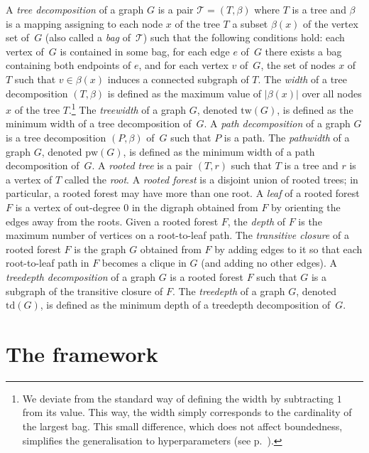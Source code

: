 \documentclass[11pt]{article}
\newcommand{\td}{\mathrm{td}}
\newcommand{\tw}{\mathrm{tw}}
\newcommand{\pw}{\mathrm{pw}}
\theoremstyle{plain}
\theoremstyle{definition}
\theoremstyle{remark}
\numberwithin{equation}{section}
\begin{document}
A \emph{tree decomposition} of a graph $G$ is a pair $\mathcal{T} =(T,\beta)$ where $T$ is a tree and $\beta$ is a mapping assigning to each node $x$ of the tree $T$ a subset $\beta(x)$ of the vertex set of~$G$ (also called a \emph{bag} of~$\mathcal{T}$) such that the following conditions hold: each vertex of~$G$ is contained in some bag, for each edge $e$ of~$G$ there exists a bag containing both endpoints of $e$, and for each vertex $v$ of~$G$, the set of nodes $x$ of $T$ such that $v\in \beta(x)$ induces a connected subgraph of $T$.
The \emph{width} of a tree decomposition $(T,\beta)$ is defined as the maximum value of $|\beta(x)|$ over all nodes $x$ of the tree $T$.\footnote{We deviate from the standard way of defining the width by subtracting $1$ from its value. This way, the width simply corresponds to the cardinality of the largest bag. 
This small difference, which does not affect boundedness, simplifies the generalisation to hyperparameters (see p.~\pageref{treewidth-hyperparameterisation}).}
The \emph{treewidth} of a graph $G$, denoted $\tw(G)$, is defined as the minimum width of a tree decomposition of~$G$.
A \emph{path decomposition} of a graph $G$ is a tree decomposition $(P,\beta)$ of~$G$ such that $P$ is a path.
The \emph{pathwidth} of a graph $G$, denoted $\pw(G)$, is defined as the minimum width of a path decomposition of~$G$.
A \emph{rooted tree} is a pair $(T,r)$ such that $T$ is a tree and $r$ is a vertex of $T$ called the \emph{root}.
A \emph{rooted forest} is a disjoint union of rooted trees; in particular, a rooted forest may have more than one root.
A \emph{leaf} of a rooted forest $F$ is a vertex of out-degree $0$ in the digraph obtained from $F$ by orienting the edges away from the roots.
Given a rooted forest $F$, the \emph{depth} of $F$ is the maximum number of vertices on a root-to-leaf path.
The \emph{transitive closure} of a rooted forest $F$ is the graph $G$ obtained from $F$ by adding edges to it so that each root-to-leaf path in $F$ becomes a clique in $G$ (and adding no other edges).
A \emph{treedepth decomposition} of a graph $G$ is a rooted forest $F$ such that $G$ is a subgraph of the transitive closure of $F$.
The \emph{treedepth} of a graph $G$, denoted $\td(G)$, is defined as the minimum depth of a treedepth decomposition of~$G$.

\section{The framework}\label{sec:framework}
\end{document}
